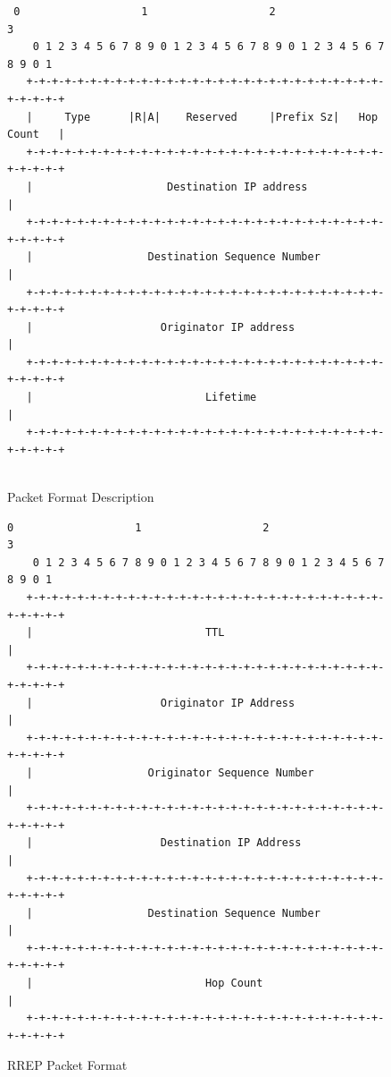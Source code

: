 \documentclass[]{nsm-thesis}
\begin{document}
\begin{figure}[h]
    \centering
\begin{verbatim}
 0                   1                   2                   3
    0 1 2 3 4 5 6 7 8 9 0 1 2 3 4 5 6 7 8 9 0 1 2 3 4 5 6 7 8 9 0 1
   +-+-+-+-+-+-+-+-+-+-+-+-+-+-+-+-+-+-+-+-+-+-+-+-+-+-+-+-+-+-+-+-+
   |     Type      |R|A|    Reserved     |Prefix Sz|   Hop Count   |
   +-+-+-+-+-+-+-+-+-+-+-+-+-+-+-+-+-+-+-+-+-+-+-+-+-+-+-+-+-+-+-+-+
   |                     Destination IP address                    |
   +-+-+-+-+-+-+-+-+-+-+-+-+-+-+-+-+-+-+-+-+-+-+-+-+-+-+-+-+-+-+-+-+
   |                  Destination Sequence Number                  |
   +-+-+-+-+-+-+-+-+-+-+-+-+-+-+-+-+-+-+-+-+-+-+-+-+-+-+-+-+-+-+-+-+
   |                    Originator IP address                      |
   +-+-+-+-+-+-+-+-+-+-+-+-+-+-+-+-+-+-+-+-+-+-+-+-+-+-+-+-+-+-+-+-+
   |                           Lifetime                            |
   +-+-+-+-+-+-+-+-+-+-+-+-+-+-+-+-+-+-+-+-+-+-+-+-+-+-+-+-+-+-+-+-+
 
\end{verbatim}
\caption{Packet Format Description}
\end{figure}
\clearpage



\begin{figure}[h]
    \centering
    \begin{verbatim}
0                   1                   2                   3
    0 1 2 3 4 5 6 7 8 9 0 1 2 3 4 5 6 7 8 9 0 1 2 3 4 5 6 7 8 9 0 1
   +-+-+-+-+-+-+-+-+-+-+-+-+-+-+-+-+-+-+-+-+-+-+-+-+-+-+-+-+-+-+-+-+
   |                           TTL                                 |
   +-+-+-+-+-+-+-+-+-+-+-+-+-+-+-+-+-+-+-+-+-+-+-+-+-+-+-+-+-+-+-+-+
   |                    Originator IP Address                      |
   +-+-+-+-+-+-+-+-+-+-+-+-+-+-+-+-+-+-+-+-+-+-+-+-+-+-+-+-+-+-+-+-+
   |                  Originator Sequence Number                   |
   +-+-+-+-+-+-+-+-+-+-+-+-+-+-+-+-+-+-+-+-+-+-+-+-+-+-+-+-+-+-+-+-+
   |                    Destination IP Address                     |
   +-+-+-+-+-+-+-+-+-+-+-+-+-+-+-+-+-+-+-+-+-+-+-+-+-+-+-+-+-+-+-+-+
   |                  Destination Sequence Number                  |
   +-+-+-+-+-+-+-+-+-+-+-+-+-+-+-+-+-+-+-+-+-+-+-+-+-+-+-+-+-+-+-+-+
   |                           Hop Count                           |
   +-+-+-+-+-+-+-+-+-+-+-+-+-+-+-+-+-+-+-+-+-+-+-+-+-+-+-+-+-+-+-+-+
    \end{verbatim}
    \caption{RREP Packet Format}
\end{figure}
\end{document}
